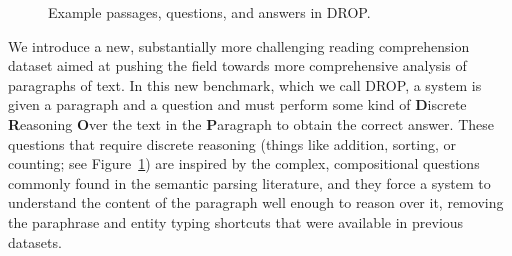 \documentclass[11pt,a4paper]{article}
\newcommand{\figref}[1]{Figure~\ref{fig:#1}}
\begin{document}
\begin{figure}
%
    \caption{Example passages, questions, and answers in DROP.}
    \label{fig:main_examples}
\end{figure}

We introduce a new, substantially more challenging reading comprehension dataset aimed at pushing the field towards more comprehensive analysis of paragraphs of text.  In this new benchmark, which we call DROP, a system is given a paragraph and a question and must perform some kind of {\bf D}iscrete {\bf R}easoning {\bf O}ver the text in the {\bf P}aragraph to obtain the correct answer.  These questions that require discrete reasoning (things like addition, sorting, or counting; see \figref{main_examples}) are inspired by the complex, compositional questions commonly found in the semantic parsing literature, and they force a system to understand the content of the paragraph well enough to reason over it, removing the paraphrase and entity typing shortcuts that were available in previous datasets.
\end{document}
